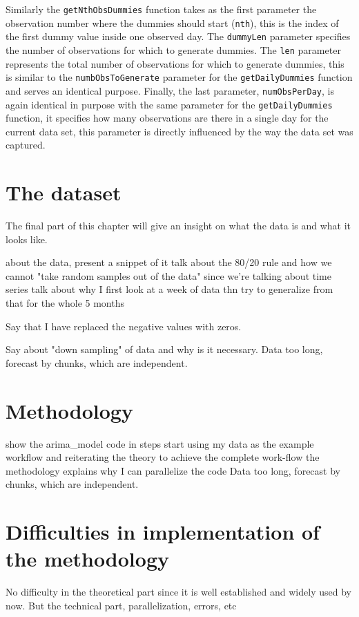 \documentclass[12pt,a4paper,titlepage]{report}
\begin{document}
Similarly the \texttt{getNthObsDummies} function takes as the first parameter the observation number where the dummies should start (\texttt{nth}), this is the index of the first dummy value inside one observed day. The \texttt{dummyLen} parameter specifies the number of observations for which to generate dummies. The \texttt{len} parameter represents the total number of observations for which to generate dummies, this is similar to the   \texttt{numbObsToGenerate} parameter for the \texttt{getDailyDummies} function and serves an identical purpose. Finally, the last parameter, \texttt{numObsPerDay}, is again identical in purpose with the same parameter for the \texttt{getDailyDummies} function, it specifies how many observations are there in a single day for the current data set, this parameter is directly influenced by the way the data set was captured.

\section{The dataset}
The final part of this chapter will give an insight on what the data is and what it looks like.

about the data, present a snippet of it
talk about the 80/20 rule and how we cannot "take random samples out of the data" since we're talking about time series
talk about why I first look at a week of data thn try to generalize from that for the whole 5 months

Say that I have replaced the negative values with zeros.

Say about "down sampling" of data and why is it necessary.
Data too long, forecast by chunks, which are independent.

\section{Methodology} \label{methodologysection}

show the arima\_model code in steps
start using my data as the example workflow and reiterating the theory to achieve the complete work-flow
the methodology explains why I can parallelize the code
Data too long, forecast by chunks, which are independent.

\section{Difficulties in implementation of the methodology}
No difficulty in the theoretical part since it is well established and widely used by now.
But the technical part, parallelization, errors, etc
\end{document}
